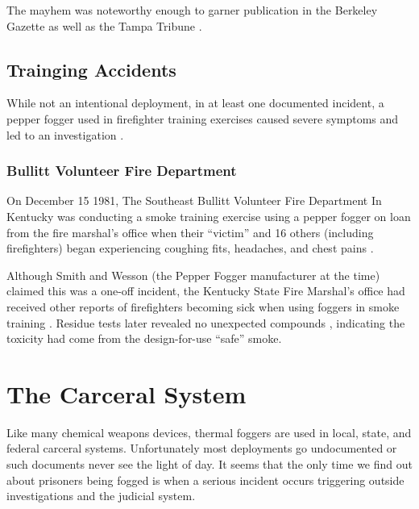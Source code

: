 \documentclass[
  11pt,
  titlepage]{krantz}
\begin{document}
The mayhem was noteworthy enough to garner publication in the Berkeley Gazette \citep{BerkeleyGazette1976_01_02} as well as the Tampa Tribune \citep{TheTampaTribune1976_01_02}.

\hypertarget{trainging-accidents}{%
\section*{Trainging Accidents}\label{trainging-accidents}}


While not an intentional deployment, in at least one documented incident, a pepper fogger used in firefighter training exercises caused severe symptoms and led to an investigation \citep{Judd1981}.

\hypertarget{bullitt-volunteer-fire-department}{%
\subsection*{Bullitt Volunteer Fire Department}\label{bullitt-volunteer-fire-department}}


On December 15 1981, The Southeast Bullitt Volunteer Fire Department In Kentucky was conducting a smoke training exercise using a pepper fogger on loan from the fire marshal's office when their ``victim'' and 16 others (including firefighters) began experiencing coughing fits, headaches, and chest pains \citep{Judd1981}.

Although Smith and Wesson (the Pepper Fogger manufacturer at the time) claimed this was a one-off incident, the Kentucky State Fire Marshal's office had received other reports of firefighters becoming sick when using foggers in smoke training \citep{Judd1981}.
Residue tests later revealed no unexpected compounds \citep{TheCourierJournal1982_01_10}, indicating the toxicity had come from the design-for-use ``safe'' smoke.

\hypertarget{CarceralSystem}{%
\chapter*{The Carceral System}\label{CarceralSystem}}


Like many chemical weapons devices, thermal foggers are used in local, state, and federal carceral systems.
Unfortunately most deployments go undocumented or such documents never see the light of day.
It seems that the only time we find out about prisoners being fogged is when a serious incident occurs triggering outside investigations and the judicial system.
\end{document}
